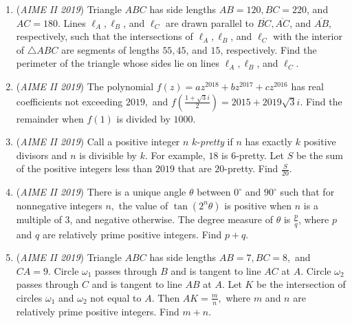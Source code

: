 \begin{enumerate}
 \[3\log(\sqrt{x}\log x)=56\]

 \[\log_{\log x}(x)=54\]
and finds that this system of equations has a single real number solution $x>1$. Find $b$.


 

	\item (\textit{AIME II 2019}) Triangle $ABC$ has side lengths $AB=120,BC=220$, and $AC=180$. Lines $\ell_A,\ell_B$, and $\ell_C$ are drawn parallel to $\overline{BC},\overline{AC}$, and $\overline{AB}$, respectively, such that the intersections of $\ell_A,\ell_B$, and $\ell_C$ with the interior of $\triangle ABC$ are segments of lengths $55,45$, and $15$, respectively. Find the perimeter of the triangle whose sides lie on lines $\ell_A,\ell_B$, and $\ell_C$.


 

	\item (\textit{AIME II 2019}) The polynomial $f(z)=az^{2018}+bz^{2017}+cz^{2016}$ has real coefficients not exceeding $2019,$ and $f\left(\frac{1+\sqrt3i}{2}\right)=2015+2019\sqrt3i$. Find the remainder when $f(1)$ is divided by $1000$.


 

	\item (\textit{AIME II 2019}) Call a positive integer $n$ $k$-\textit{pretty} if $n$ has exactly $k$ positive divisors and $n$ is divisible by $k$. For example, $18$ is $6$-pretty. Let $S$ be the sum of the positive integers less than $2019$ that are $20$-pretty. Find $\frac{S}{20}$.


 

	\item (\textit{AIME II 2019}) There is a unique angle $\theta$ between $0^\circ$ and $90^\circ$ such that for nonnegative integers $n,$ the value of $\tan(2^n\theta)$ is positive when $n$ is a multiple of $3$, and negative otherwise. The degree measure of $\theta$ is $\frac{p}{q}$, where $p$ and $q$ are relatively prime positive integers. Find $p+q$.


 

	\item (\textit{AIME II 2019}) Triangle $ABC$ has side lengths $AB=7,BC=8,$ and $CA=9.$ Circle $\omega_1$ passes through $B$ and is tangent to line $AC$ at $A.$ Circle $\omega_2$ passes through $C$ and is tangent to line $AB$ at $A.$ Let $K$ be the intersection of circles $\omega_1$ and $\omega_2$ not equal to $A.$ Then $AK=\frac{m}{n},$ where $m$ and $n$ are relatively prime positive integers. Find $m+n.$



\end{enumerate}
